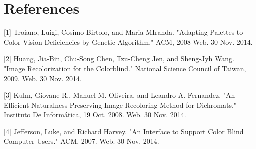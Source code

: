 \documentclass[10pt,twocolumn,letterpaper]{article}
\begin{document}
\section{References}

{\small


[1] Troiano, Luigi, Cosimo Birtolo, and Maria MIranda. "Adapting Palettes to Color Vision Deficiencies by Genetic Algorithm." ACM, 2008 Web. 30 Nov. 2014.

[2] Huang, Jia-Bin, Chu-Song Chen, Tzu-Cheng Jen, and Sheng-Jyh Wang. "Image Recolorization for the Colorblind." National Science Council of Taiwan, 2009. Web. 30 Nov. 2014.

[3] Kuhn, Giovane R., Manuel M. Oliveira, and Leandro A. Fernandez. "An Efficient Naturalness-Preserving Image-Recoloring Method for Dichromats." Instituto De Informática, 19 Oct. 2008. Web. 30 Nov. 2014.

[4] Jefferson, Luke, and Richard Harvey. "An Interface to Support Color Blind Computer Users." ACM, 2007. Web. 30 Nov. 2014.

}
\end{document}
